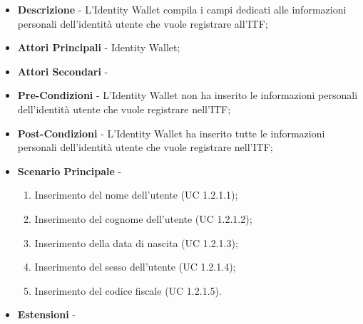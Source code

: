 \begin{itemize}
	\item \textbf{Descrizione} - L'Identity Wallet compila i campi dedicati alle informazioni personali dell'identità utente che vuole registrare all'ITF;
	\item \textbf{Attori Principali} - Identity Wallet;
	\item \textbf{Attori Secondari} -
	\item \textbf{Pre-Condizioni} - L'Identity Wallet non ha inserito le informazioni personali dell'identità utente che vuole registrare nell'\gls{ITF};
	\item \textbf{Post-Condizioni} - L'Identity Wallet ha inserito tutte le informazioni personali dell'identità utente che vuole registrare nell'\gls{ITF};
	\item \textbf{Scenario Principale} -
	\begin{enumerate}
		\item Inserimento del nome dell'utente (UC 1.2.1.1);
		\item Inserimento del cognome dell'utente (UC 1.2.1.2);
		\item Inserimento della data di nascita (UC 1.2.1.3);
		\item Inserimento del sesso dell'utente (UC 1.2.1.4);
		\item Inserimento del codice fiscale (UC 1.2.1.5).
	\end{enumerate}
	\item \textbf{Estensioni} -
\end{itemize}
\newpage
